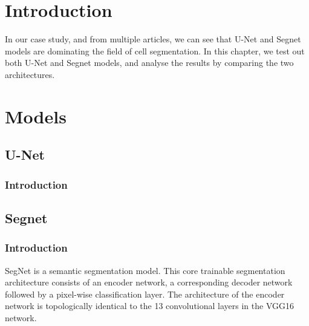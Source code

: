 \section{Introduction}
\vspace{0.2in}
\hspace*{0.16in}
In our case study, and from multiple articles, we can see that U-Net and Segnet models are dominating the field of cell segmentation.
In this chapter, we test out both U-Net and Segnet models, and analyse the results by comparing the two architectures.

\section{Models}
\vspace{0.2in}
\hspace*{0.16in}
\lipsum[3-3]

\subsection{U-Net}
\subsubsection{Introduction}
\lipsum[2-2]

\subsection{Segnet}
\subsubsection{Introduction}
SegNet is a semantic segmentation model. This core trainable segmentation architecture consists of an encoder network, a corresponding decoder network followed by a pixel-wise classification layer. The architecture of the encoder network is topologically identical to the 13 convolutional layers in the VGG16 network. \textsuperscript{\cite{badrinarayanan2017segnet}}

